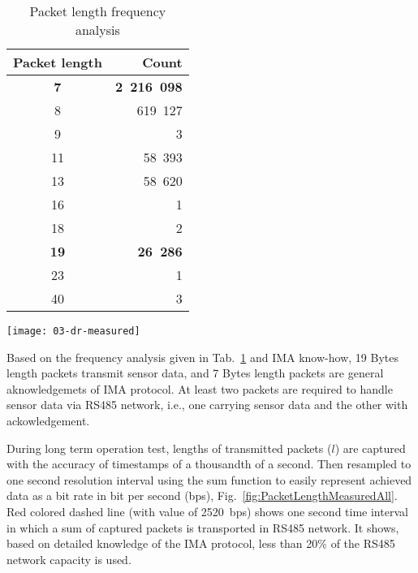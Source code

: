 \begin{table}[h]
\centering
\footnotesize
\caption{Packet length frequency analysis}
\begin{tabular}{cr}
Packet length &  Count \\ \hline
\textbf{7}  &  \textbf{2~216~098}  \\
8  &   619~127   \\
9  &         3   \\
11 &    58~393   \\
13 &    58~620   \\
16 &         1   \\
18 &         2   \\
\textbf{19} &    \textbf{26~286}   \\
23 &         1   \\
40 &         3   \\
\end{tabular}
\label{tab:FreqAnalysis}
\end{table}

\begin{figure*}[ht]
    \centering
    \texttt{[image: 03-dr-measured]}
    \caption{Measured data rate in [bps] in RS485 network during long-term operation test}
    \label{fig:PacketLengthMeasuredAll}
\end{figure*}

Based on the frequency analysis given in Tab.~\ref{tab:FreqAnalysis} and IMA know-how, 19 Bytes length packets transmit sensor data, and 7 Bytes length packets are general aknowledgemets of IMA protocol. At least two packets are required to handle sensor data via RS485 network, i.e., one carrying sensor data and the other with ackowledgement.


During long term operation test, lengths of transmitted packets ($ l $) are captured with the accuracy of timestamps of a thousandth of a second. Then resampled to one second resolution interval using the sum function to easily represent achieved data as a bit rate in bit per second (bps),
Fig.~\ref{fig:PacketLengthMeasuredAll}.
Red colored dashed line (with value of 2520~bps) shows one second time interval in which a sum of captured packets is transported in RS485 network. It shows, based on detailed knowledge of the IMA protocol, less than 20\% of the RS485 network capacity is used. 

